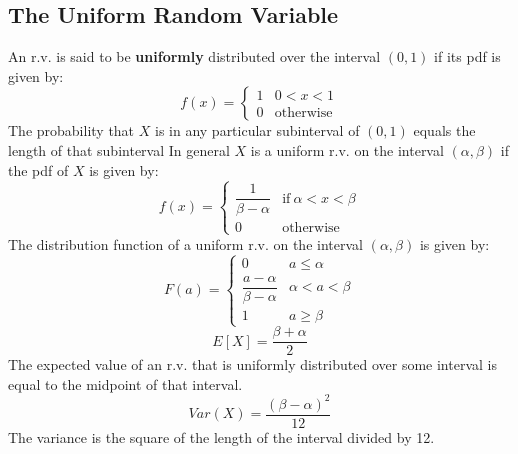 \documentclass[openany]{book}
\numberwithin{equation}{section}
\begin{document}
\begin{flushleft}
\section{The Uniform Random Variable}
An r.v. is said to be \textbf{uniformly} distributed over the interval $(0,1)$ if its pdf is given by:
\begin{equation}
	\label{5.3.1}
f(x)=\begin{cases}
1 & 0<x<1\\
0 & \text{otherwise}
\end{cases}
\end{equation}
The probability that $X$ is in any particular subinterval of $(0,1)$ equals the length of that subinterval \medbreak
 In general $X$ is a uniform r.v. on the interval $(\alpha, \beta)$ if the pdf of $X$ is given by:
 \begin{equation}
 	\label{5.3.2}
 	f(x)=\begin{cases}
 	\dfrac{1}{\beta - \alpha} & \text{if} \ \alpha<x<\beta\\
 	0 & \text{otherwise}
 	\end{cases}
 \end{equation}
The distribution function of a uniform r.v. on the interval $(\alpha, \beta)$ is given by:
\[F(a)= \begin{cases}
0 & a\leq \alpha\\
\dfrac{a-\alpha}{\beta- \alpha} & \alpha<a<\beta\\
1 & a\geq \beta
\end{cases}
\]
\[E[X]=\frac{\beta+ \alpha}{2}
\]
The expected value of an r.v. that is uniformly distributed over some interval is equal to the midpoint of that interval. \medbreak
\[Var(X)=\frac{(\beta-\alpha)^2}{12}
\]
The variance is the square of the length of the interval divided by 12.

\end{flushleft}
\end{document}
